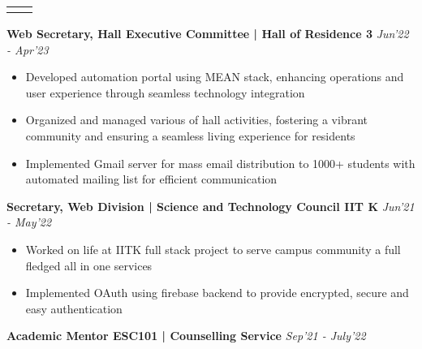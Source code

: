 \documentclass[10pt]{extarticle}
\begin{document}
{\begin{flushleft}
\begin{center}
\begin{tabularx}{\textwidth}{ p{1.7cm} | X }
\begin{tabitemize}
\end{tabitemize}\\
\end{tabularx}
\end{center} 
\begin{tcolorbox}[center, width=20.7cm, colback=black!10]
\textbf{Web Secretary, Hall Executive Committee | Hall of Residence 3}  \hfill\hfill\textcolor{black!80}{\small \textit{Jun'22 - Apr'23}}
\end{tcolorbox}
\vspace{-10pt}
\begin{itemize}
\vspace{2.0mm}
    \item Developed automation portal using MEAN stack, enhancing operations and user experience through seamless technology integration
    \item Organized and managed various of hall activities, fostering a vibrant community and ensuring a seamless living experience for residents
    \item Implemented Gmail server for mass email distribution to 1000+ students with automated mailing list for efficient communication
\end{itemize}
\begin{tcolorbox}[center, width=20.7cm, colback=black!10]
\textbf{Secretary, Web Division | Science and Technology Council IIT K}  \hfill\hfill\textcolor{black!80}{\small \textit{Jun'21 - May'22}}
\end{tcolorbox}
\vspace{-10pt}
\begin{itemize}
\vspace{2.0mm}
    \item Worked on life at IITK full stack project to serve campus community a full fledged all in one services
    \item Implemented OAuth using firebase backend to provide encrypted, secure and easy authentication
\end{itemize}
\begin{tcolorbox}[center, width=20.7cm, colback=black!10]
\textbf{Academic Mentor ESC101 | Counselling Service}  \hfill\hfill\textcolor{black!80}{\small \textit{Sep'21 - July'22}}
\end{tcolorbox}
\vspace{-10pt}
\begin{itemize}
\vspace{2.0mm}

\end{itemize}
\end{flushleft}}
\end{document}
